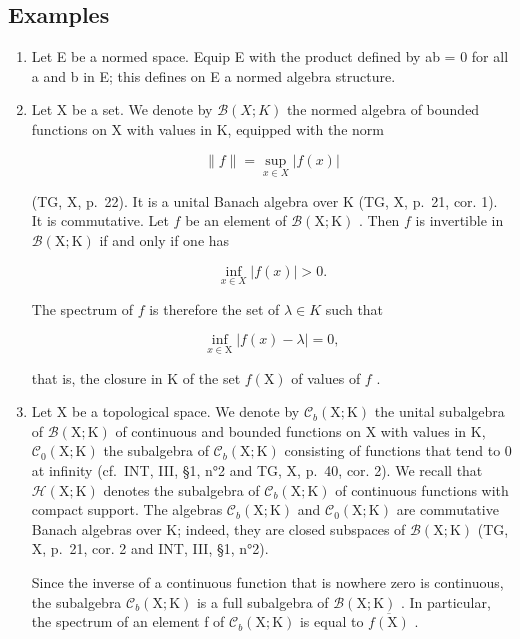 \subsection{Examples}

\begin{enumerate}
\def\labelenumi{\arabic{enumi})}
\item
  Let E be a normed space. Equip E with the product defined by ab = 0 for all a and b in E; this defines on E a normed algebra structure.
\item
  Let X be a set. We denote by \(\mathcal{B}(X;K)\) the normed algebra of bounded functions on X with values in K, equipped with the norm

\[
\| f \| = \sup _ {x \in X} | f (x) |
\]

(TG, X, p.~22). It is a unital Banach algebra over K (TG, X, p.~21, cor. 1). It is commutative. Let \(f\) be an element of \(\mathcal{B}(\mathrm{X};\mathrm{K})\) . Then \(f\) is invertible in \(\mathcal{B}(\mathrm{X};\mathrm{K})\) if and only if one has

\[
\inf _ {x \in X} | f (x) | > 0.
\]

The spectrum of \(f\) is therefore the set of \(\lambda\in K\) such that

\[
\inf _ {x \in \mathrm{X}} | f (x) - \lambda | = 0,
\]

that is, the closure in K of the set \(f(\mathrm{X})\) of values of \(f\) .

\item
  Let X be a topological space. We denote by \(\mathcal{C}_{b}(\mathrm{X};\mathrm{K})\) the unital subalgebra of \(\mathcal{B}(\mathrm{X};\mathrm{K})\) of continuous and bounded functions on X with values in K, \(\mathcal{C}_{0}(\mathrm{X};\mathrm{K})\) the subalgebra of \(\mathcal{C}_{b}(\mathrm{X};\mathrm{K})\) consisting of functions that tend to 0 at infinity (cf.~INT, III, §1, n°2 and TG, X, p.~40, cor. 2). We recall that \(\mathcal{H}(\mathrm{X};\mathrm{K})\) denotes the subalgebra of \(\mathcal{C}_{b}(\mathrm{X};\mathrm{K})\) of continuous functions with compact support.
The algebras \(\mathcal{C}_{b}(\mathrm{X};\mathrm{K})\) and \(\mathcal{C}_{0}(\mathrm{X};\mathrm{K})\) are commutative Banach algebras over K; indeed, they are closed subspaces of \(\mathcal{B}(\mathrm{X};\mathrm{K})\) (TG, X, p.~21, cor. 2 and INT, III, §1, n°2).

Since the inverse of a continuous function that is nowhere zero is continuous, the subalgebra \(\mathcal{C}_{b}(\mathrm{X};\mathrm{K})\) is a full subalgebra of \(\mathcal{B}(\mathrm{X};\mathrm{K})\) . In particular, the spectrum of an element f of \(\mathcal{C}_{b}(\mathrm{X};\mathrm{K})\) is equal to \(\overline{f(\mathrm{X})}\) .


\end{enumerate}
